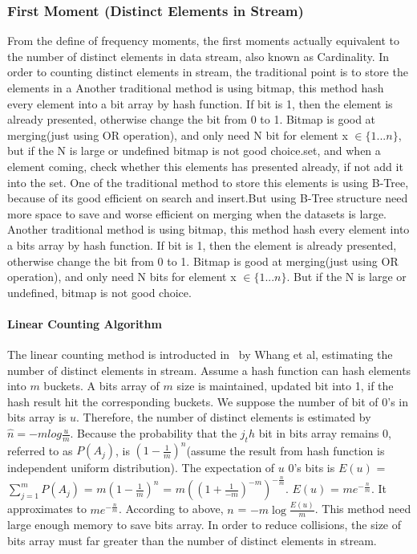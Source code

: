 \subsubsection{First Moment (Distinct Elements in Stream)}
From the define of frequency moments, the first moments actually equivalent to
the number of distinct elements in data stream, also known as Cardinality. In
order to counting distinct elements in stream, the traditional point is to store
the elements in a Another traditional method is using bitmap, this method hash
every element into a bit array by hash function. If bit is 1, then the element
is already presented, otherwise change the bit from 0 to 1. Bitmap is good at
merging(just using OR operation), and only need N bit for element x $\in
\{1...n\}$, but if the N is large or undefined bitmap is not good choice.set,
and when a element coming, check whether this elements has presented already, if
not add it into the set. One of the traditional method to store this elements is
using B-Tree, because of its good efficient on search and insert.But using
B-Tree structure need more space to save and worse efficient on merging when the
datasets is large. Another traditional method is using bitmap, this method hash
every element into a bits array by hash function. If bit is 1, then the element
is already presented, otherwise change the bit from 0 to 1. Bitmap is good at
merging(just using OR operation), and only need N bits for element x $\in
\{1...n\}$. But if the N is large or undefined, bitmap is not good choice.

\paragraph{Linear Counting Algorithm}
The linear counting method is introducted in~\cite{whang1990linear} by Whang et
al, estimating the number of distinct elements in stream. Assume a hash function
can hash elements into $m$ buckets. A bits array of $m$ size is maintained,
updated bit into 1, if the hash result hit the corresponding buckets. We suppose
the number of bit of 0's in bits array is $u$. Therefore, the number of distinct
elements is estimated by $\hat{n} = -mlog\frac{u}{m}$. Because the probability
that the $j_th$ bit in bits array remains 0, referred to as $P(A_j)$, is
$(1-\frac{1}{m})^n$(assume the result from hash function is independent uniform
distribution). The expectation of $u$ 0's bits is $E(u)$ = $\sum_{j=1}^{m}
P(A_j)$ = $m(1-\frac{1}{m})^n$ = $m((1+\frac{1}{-m})^{-m})^{-\frac{n}{m}}$.
$E(u)$ = $me^{-\frac{n}{m}} $. It approximates to $me^{-\frac{n}{m}}$. According
to above, $n$ = $-m\log{\frac{E(u)}{m}}$. This method need large enough memory
to save bits array. In order to reduce collisions, the size of bits array must
far greater than the number of distinct elements in stream.

